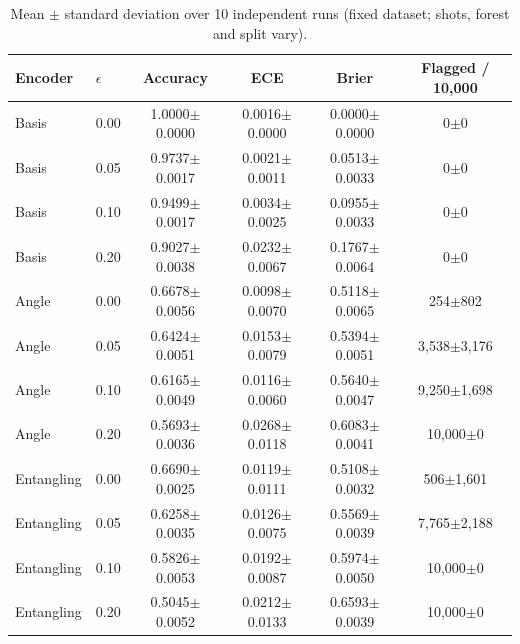 \begin{table}[htbp]
\centering
\small
\caption{Mean $\pm$ standard deviation over 10 independent runs (fixed dataset; shots, forest and split vary).}
\label{tab:multiseed}
\begin{tabular}{llcccc}
\toprule
Encoder & $\epsilon$ & Accuracy & ECE & Brier & Flagged / 10{,}000\\
\midrule
Basis & 0.00 & 1.0000$\pm$0.0000 & 0.0016$\pm$0.0000 & 0.0000$\pm$0.0000 & 0$\pm$0\\
Basis & 0.05 & 0.9737$\pm$0.0017 & 0.0021$\pm$0.0011 & 0.0513$\pm$0.0033 & 0$\pm$0\\
Basis & 0.10 & 0.9499$\pm$0.0017 & 0.0034$\pm$0.0025 & 0.0955$\pm$0.0033 & 0$\pm$0\\
Basis & 0.20 & 0.9027$\pm$0.0038 & 0.0232$\pm$0.0067 & 0.1767$\pm$0.0064 & 0$\pm$0\\
\midrule
Angle & 0.00 & 0.6678$\pm$0.0056 & 0.0098$\pm$0.0070 & 0.5118$\pm$0.0065 & 254$\pm$802\\
Angle & 0.05 & 0.6424$\pm$0.0051 & 0.0153$\pm$0.0079 & 0.5394$\pm$0.0051 & 3{,}538$\pm$3{,}176\\
Angle & 0.10 & 0.6165$\pm$0.0049 & 0.0116$\pm$0.0060 & 0.5640$\pm$0.0047 & 9{,}250$\pm$1{,}698\\
Angle & 0.20 & 0.5693$\pm$0.0036 & 0.0268$\pm$0.0118 & 0.6083$\pm$0.0041 & 10{,}000$\pm$0\\
\midrule
Entangling & 0.00 & 0.6690$\pm$0.0025 & 0.0119$\pm$0.0111 & 0.5108$\pm$0.0032 & 506$\pm$1{,}601\\
Entangling & 0.05 & 0.6258$\pm$0.0035 & 0.0126$\pm$0.0075 & 0.5569$\pm$0.0039 & 7{,}765$\pm$2{,}188\\
Entangling & 0.10 & 0.5826$\pm$0.0053 & 0.0192$\pm$0.0087 & 0.5974$\pm$0.0050 & 10{,}000$\pm$0\\
Entangling & 0.20 & 0.5045$\pm$0.0052 & 0.0212$\pm$0.0133 & 0.6593$\pm$0.0039 & 10{,}000$\pm$0\\
\bottomrule
\end{tabular}
\end{table}
